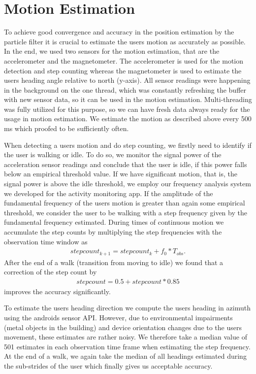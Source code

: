 \documentclass[conference]{IEEEtran}
\begin{document}
\section{Motion Estimation}
\label{sec:motion}
To achieve good convergence and accuracy in the position estimation by the particle filter it is crucial to estimate the users motion as accurately as possible.  In the end, we used two sensors for the motion estimation, that are the accelerometer and the magnetometer. The accelerometer is used for the motion detection and step counting whereas the magnetometer is used to estimate the users heading angle relative to north (y-axis). All sensor readings were happening in the background on the one thread, which was constantly refreshing the buffer with new sensor data, so it can be used in the motion estimation. Multi-threading was fully utilized for this purpose, so we can have fresh data always ready for the usage in motion estimation. 
We estimate the motion as described above every 500 ms which proofed to be sufficiently often.

When detecting a users motion and do step counting, we firstly need to identify if the user is walking or idle. To do so, we monitor the signal power of the acceleration sensor readings and conclude that the user is idle, if this power falls below an empirical threshold value. If we have significant motion, that is, the signal power is above the idle threshold, we employ our frequency analysis system we developed for the activity monitoring app. If the amplitude of the fundamental frequency of the users motion is greater than again some empirical threshold, we consider the user to be walking with a step frequency given by the fundamental frequency estimated. During times of continuous motion we accumulate the step counts by multiplying the step frequencies with the observation time window as
\begin{align*}
step count_{k + 1} = step count_k + f_0 * T_{obs}.
\end{align*}
After the end of a walk (transition from moving to idle) we found that a correction of the step count by
\begin{align*}
step count = 0.5 + step count * 0.85
\end{align*}
improves the accuracy significantly.


To estimate the users heading direction we compute the users heading in azimuth using the androids sensor API. However, due to environmental impairments (metal objects in the building) and device orientation changes due to the users movement, these estimates are rather noisy. We therefore take a median value of 501 estimates in each observation time frame when estimating the step frequency. At the end of a walk, we again take the median of all headings estimated during the sub-strides of the user which finally gives us acceptable accuracy.
\end{document}
